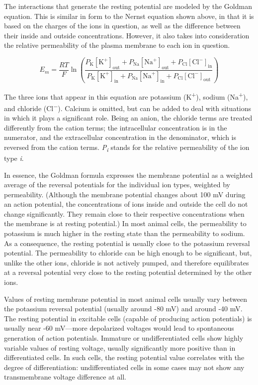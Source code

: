 \documentclass[]{book}
\begin{document}
The interactions that generate the resting potential are modeled by the Goldman equation. This is similar in form to the Nernst equation shown above, in that it is based on the charges of the ions in question, as well as the difference between their inside and outside concentrations. However, it also takes into consideration the relative permeability of the plasma membrane to each ion in question.

\[ E_{m} = \frac{RT}{F} \ln{ \left( \frac{ P_{\mathrm{K}}[\mathrm{K}^{+}]_\mathrm{out} + P_{\mathrm{Na}}[\mathrm{Na}^{+}]_\mathrm{out} + P_{\mathrm{Cl}}[\mathrm{Cl}^{-}]_\mathrm{in}}{ P_{\mathrm{K}}[\mathrm{K}^{+}]_\mathrm{in} + P_{\mathrm{Na}}[\mathrm{Na}^{+}]_\mathrm{in} + P_{\mathrm{Cl}}[\mathrm{Cl}^{-}]_\mathrm{out}} \right) } \]

The three ions that appear in this equation are potassium (K\textsuperscript{+}), sodium (Na\textsuperscript{+}), and chloride (Cl\textsuperscript{−}). Calcium is omitted, but can be added to deal with situations in which it plays a significant role. Being an anion, the chloride terms are treated differently from the cation terms; the intracellular concentration is in the numerator, and the extracellular concentration in the denominator, which is reversed from the cation terms. \emph{P\textsubscript{i}} stands for the relative permeability of the ion type \emph{i}.

In essence, the Goldman formula expresses the membrane potential as a weighted average of the reversal potentials for the individual ion types, weighted by permeability. (Although the membrane potential changes about 100 mV during an action potential, the concentrations of ions inside and outside the cell do not change significantly. They remain close to their respective concentrations when the membrane is at resting potential.) In most animal cells, the permeability to potassium is much higher in the resting state than the permeability to sodium. As a consequence, the resting potential is usually close to the potassium reversal potential. The permeability to chloride can be high enough to be significant, but, unlike the other ions, chloride is not actively pumped, and therefore equilibrates at a reversal potential very close to the resting potential determined by the other ions.

Values of resting membrane potential in most animal cells usually vary between the potassium reversal potential (usually around -80 mV) and around -40 mV. The resting potential in excitable cells (capable of producing action potentials) is usually near -60 mV---more depolarized voltages would lead to spontaneous generation of action potentials. Immature or undifferentiated cells show highly variable values of resting voltage, usually significantly more positive than in differentiated cells. In such cells, the resting potential value correlates with the degree of differentiation: undifferentiated cells in some cases may not show any transmembrane voltage difference at all.
\end{document}
